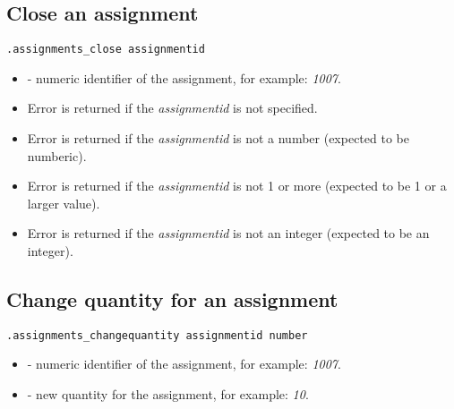 \subsection{Close an assignment}

\begin{lstlisting}[style=CommandLineStyle]
.assignments_close assignmentid
\end{lstlisting}

\paramsheader
\begin{itemize}
    \item {} - numeric identifier of the assignment, for example: \textit{1007}.
\end{itemize}

\errheader
\begin{itemize}
    \item Error  is returned if the \textit{assignmentid} is not specified.
    \item Error  is returned if the \textit{assignmentid} is not a number (expected to be numberic).
    \item Error  is returned if the \textit{assignmentid} is not 1 or more (expected to be 1 or a larger value).
    \item Error  is returned if the \textit{assignmentid} is not an integer (expected to be an integer).
\end{itemize}



\subsection{Change quantity for an assignment}

\begin{lstlisting}[style=CommandLineStyle]
.assignments_changequantity assignmentid number
\end{lstlisting}

\paramsheader
\begin{itemize}
    \item {} - numeric identifier of the assignment, for example: \textit{1007}.
    \item {} - new quantity for the assignment, for example: \textit{10}.
\end{itemize}


